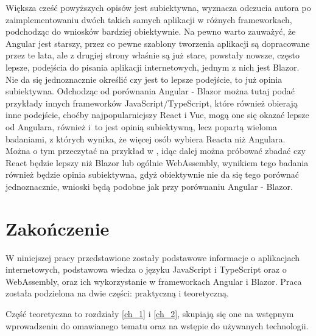 \documentclass[12pt,a4paper,oneside]{book}
\begin{document}
Większa cześć powyższych opisów jest subiektywna, wyznacza odczucia autora po zaimplementowaniu dwóch takich samych aplikacji w różnych frameworkach, podchodząc do wniosków bardziej obiektywnie. Na pewno warto zauważyć, że Angular jest starszy, przez co pewne szablony tworzenia aplikacji są dopracowane przez te lata, ale z drugiej strony właśnie są już stare, powstały nowsze, często lepsze, podejścia do pisania aplikacji internetowych, jednym z nich jest Blazor. Nie da się jednoznacznie określić czy jest to lepsze podejście, to już opinia subiektywna. Odchodząc od porównania Angular - Blazor można tutaj podać przykłady innych frameworków JavaScript/TypeScript, które również obierają inne podejście, choćby najpopularniejszy React i Vue, mogą one się okazać lepsze od Angulara, również i~to jest opinią subiektywną, lecz popartą wieloma badaniami, z których wynika, że więcej osób wybiera Reacta niż Angulara. Można o tym przeczytać na przykład w \cite{STACKOVERFLOW_MOST_LOVED_2021}, idąc dalej można próbować zbadać czy React będzie lepszy niż Blazor lub ogólnie WebAssembly, wynikiem tego badania również będzie opinia subiektywna, gdyż obiektywnie nie da się tego porównać jednoznacznie, wnioski będą podobne jak przy porównaniu Angular - Blazor.


\chapter*{Zakończenie}


W niniejszej pracy przedstawione zostały podstawowe informacje o aplikacjach internetowych, podstawowa wiedza o języku JavaScript i TypeScript oraz o WebAssembly, oraz ich wykorzystanie w frameworkach Angular i Blazor. Praca została podzielona na dwie części: praktyczną i teoretyczną.

Część teoretyczna to rozdziały \ref{ch_1} i \ref{ch_2}, skupiają się one na wstępnym wprowadzeniu do omawianego tematu oraz na wstępie do używanych technologii.
\end{document}
